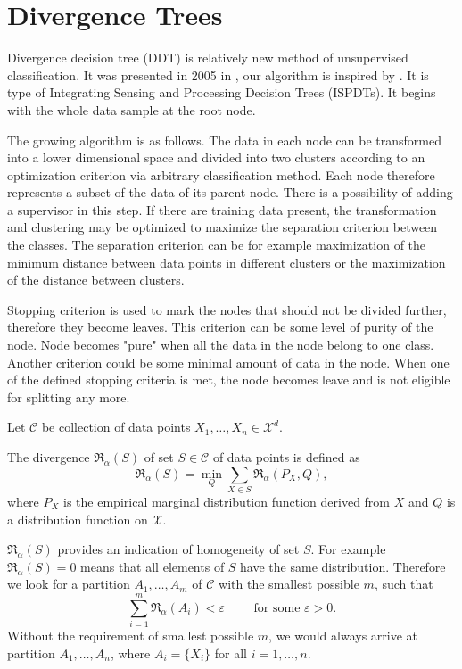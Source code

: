 \chapter{Divergence Trees}\label{ch:DDT}

Divergence decision tree (DDT)  is relatively new method of unsupervised classification. It was presented in 2005 in \cite{Karakos2005}, our algorithm is inspired by \cite{Karakos2008}. It is type of Integrating Sensing and Processing Decision Trees (ISPDTs). It  begins with the whole data sample at the root node. 

The growing algorithm is as follows. The data in each node can be transformed into a lower dimensional space and divided into two clusters according to an optimization criterion via arbitrary classification method. Each node therefore represents a subset of the data of its parent node.  There is a possibility of adding a supervisor in this step. If there are training data present, the transformation and clustering may be optimized to maximize the separation criterion between the classes. The separation criterion can be for example maximization of the minimum distance between data points in different clusters or the maximization of the distance between clusters. 

Stopping criterion is used to mark the nodes that should not be divided further, therefore they become leaves. This criterion can be some level of purity of the node. Node becomes "pure" when all the data in the node belong to one class. Another criterion could be some minimal amount of data in the node. When one of the defined stopping criteria is met, the node becomes leave and is not eligible for splitting any more. 

Let $\mathcal{C}$ be collection of data points $X_1,\ldots,X_n \in \mathcal{X}^d.$

\begin{definition}
The \ren divergence $\mathfrak{R}_\alpha(S)$ of set $S\in \mathcal{C}$ of data points is defined as 
\begin{equation}
\mathfrak{R}_\alpha(S) = \min_Q \sum_{X \in S} \mathfrak{R}_ \alpha(P_X, Q),
\end{equation}
where $P_X$ is the empirical marginal distribution function derived from $X$ and $Q$ is a distribution function on $\mathcal{X}.$ 
\end{definition}

\noindent $\mathfrak{R}_\alpha(S)$ provides an indication of homogeneity of set $S$. For example $\mathfrak{R}_\alpha(S) = 0$ means that all elements of $S$ have the same distribution. Therefore we look for a partition $A_1,\ldots,A_m$ of $\mathcal{C}$ with the smallest possible $m$, such that
\begin{equation}
\sum_{i=1}^m \mathfrak{R}_\alpha(A_i) < \varepsilon \qquad \text{ for some } \varepsilon > 0.
\end{equation}
Without the requirement of smallest possible $m$, we would always arrive at partition $A_1,\ldots,A_n$, where $A_i = \lbrace X_i\rbrace$ for all $i=1,\ldots,n.$ 

